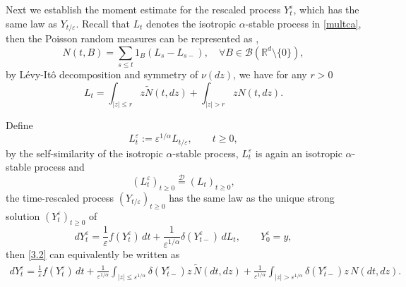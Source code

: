 \documentclass[11pt,reqno]{amsart}
\numberwithin{equation}{section}
\begin{document}
Next we establish the moment estimate for the rescaled process
$Y_t^\varepsilon$, which has the same law as $Y_{t/\varepsilon}$.
Recall that $L_t$ denotes the isotropic $\alpha$-stable process in \eqref{multca}, then the Poisson random measures can be represented as \cite{DA},
$$ N(t,B)=\sum_{s\leq t}1_{B}(L_{s}-L_{s-}),\quad \forall B\in \mathcal{B}(\mathbb{R}^{d }\setminus\{0\}),$$
by L\'{e}vy-It\^{o} decomposition and symmetry of $\nu(dz)$, we have for any $r>0$
\begin{equation*}
	 L_{t}=\int_{|z|\leq r}z \tilde{N}(t,dz)+\int_{|z|> r}zN(t,dz).
\end{equation*}	 


Define
\[
L_t^\varepsilon:=\varepsilon^{1/\alpha}L_{t/\varepsilon},
\qquad t\ge0,
\]
by the self-similarity of the isotropic $\alpha$-stable
process, $L^\varepsilon_t$ is again an isotropic
$\alpha$-stable process and
\[
(L_t^\varepsilon)_{t\ge0}\overset{\mathcal D}{=}(L_t)_{t\ge0},
\]
 the time-rescaled process
$(Y_{t/\varepsilon})_{t\ge0}$ has the same law as the
unique strong solution $(Y_t^\varepsilon)_{t\ge0}$ of
\begin{equation}\label{3.2}
	dY_t^\varepsilon
	=\frac1\varepsilon f(Y_t^\varepsilon)\,dt	+\frac1{\varepsilon^{1/\alpha}}
	\delta(Y_{t-}^\varepsilon)\,dL_t,	\qquad
	Y_0^\varepsilon=y,
\end{equation}
then \eqref{3.2}
can equivalently be written as
\begin{align}\label{3.2-1}
	dY_t^\varepsilon
	=\frac1\varepsilon f(Y_t^\varepsilon)\,dt
	+\frac1{\varepsilon^{1/\alpha}}
	\int_{|z|\le\varepsilon^{1/\alpha}}
	\delta(Y_{t-}^\varepsilon)z\,\tilde N(dt,dz)
	+\frac1{\varepsilon^{1/\alpha}}
	\int_{|z|>\varepsilon^{1/\alpha}}
	\delta(Y_{t-}^\varepsilon)z\,N(dt,dz).
\end{align}
\end{document}
